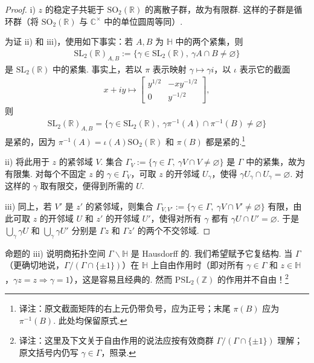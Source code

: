 \begin{proof}
i) $z$ 的稳定子共轭于 $\mathrm{SO}_2(\mathbb R)$ 的离散子群，故为有限群. 这样的子群是循环群（将 $\mathrm{SO}_2(\mathbb R)$ 与 $\mathbb C^\times$ 中的单位圆周等同）.

为证 ii) 和 iii)，使用如下事实：若 $A,B$ 为 $\mathbb H$ 中的两个紧集，则
\begin{align*}
\mathrm{SL}_2(\mathbb R)_{A,B}:=\{\gamma\in\mathrm{SL}_2(\mathbb R),\ \gamma A\cap B\ne\varnothing\}
\end{align*}
是 $\mathrm{SL}_2(\mathbb R)$ 中的紧集. 事实上，若以 $\pi$ 表示映射 $\gamma\mapsto\gamma i$，以 $\iota$ 表示它的截面
\begin{align*}
x+iy\longmapsto\begin{bmatrix}y^{1/2}&-xy^{-1/2}\\0&y^{-1/2}\end{bmatrix},
\end{align*}
则
\begin{align*}
\mathrm{SL}_2(\mathbb R)_{A,B}=\{\gamma\in\mathrm{SL}_2(\mathbb R),\ \gamma\pi^{-1}(A)\cap\pi^{-1}(B)\ne\varnothing\}
\end{align*}
是紧的，因为 $\pi^{-1}(A)=\iota(A)\mathrm{SO}_2(\mathbb R)$ 和 $\pi(B)$ 都是紧的.\footnote{译注：原文截面矩阵的右上元仍带负号，应为正号；末尾 $\pi(B)$ 应为 $\pi^{-1}(B)$. 此处均保留原式.}

ii) 将此用于 $z$ 的紧邻域 $V$. 集合 $\Gamma_V:=\{\gamma\in\Gamma,\ \gamma V\cap V\ne\varnothing\}$ 是 $\Gamma$ 中的紧集，故为有限集. 对每个不固定 $z$ 的 $\gamma\in\Gamma_V$，可取 $z$ 的开邻域 $U_\gamma$，使得 $\gamma U_\gamma\cap U_\gamma=\varnothing$. 对这样的 $\gamma$ 取有限交，便得到所需的 $U$.

iii) 同上，若 $V'$ 是 $z'$ 的紧邻域，则集合 $\Gamma_{V,V'}:=\{\gamma\in\Gamma,\ \gamma V\cap V'\ne\varnothing\}$ 有限，由此可取 $z$ 的开邻域 $U$ 和 $z'$ 的开邻域 $U'$，使得对所有 $\gamma$ 都有 $\gamma U\cap U'=\varnothing$. 于是 $\bigcup_\gamma\gamma U$ 和 $\bigcup_\gamma\gamma U'$ 分别是 $\Gamma z$ 和 $\Gamma z'$ 的两个不交邻域.
\end{proof}
命题的 iii) 说明商拓扑空间 $\Gamma\backslash\mathbb H$ 是 Hausdorff 的. 我们希望赋予它复结构. 当 $\Gamma$（更确切地说，$\Gamma/(\Gamma\cap\{\pm1\})$）在 $\mathbb H$ 上自由作用时（即对所有 $\gamma\in\Gamma$ 和 $z\in\mathbb H$，$\gamma z=z\Rightarrow\gamma=1$），这是容易且经典的. 然而 $\mathrm{PSL}_2(\mathbb Z)$ 的作用并不自由！\footnote{译注：这里及下文关于自由作用的说法应按有效商群 $\Gamma/(\Gamma\cap\{\pm1\})$ 理解；原文括号内仍写 $\gamma\in\Gamma$，照录.}

